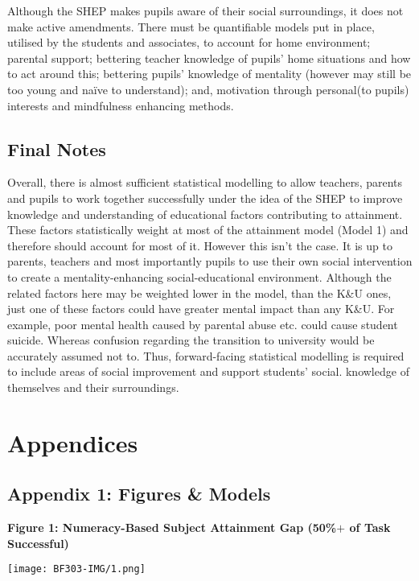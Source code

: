 \documentclass[11pt, english]{article}
\begin{document}
	Although the SHEP makes pupils aware of their social surroundings, it does not make active amendments. There must be quantifiable models put in place, utilised by the students and associates, to account for home environment; parental support; bettering teacher knowledge of pupils’ home situations and how to act around this; bettering pupils’ knowledge of mentality (however may still be too young and naïve to understand); and, motivation through personal(to pupils) interests and mindfulness enhancing methods.

	\subsection{Final Notes}

	Overall, there is almost sufficient statistical modelling to allow teachers, parents and pupils to work together successfully under the idea of the SHEP to improve knowledge and understanding of educational factors contributing to attainment. These factors statistically weight at most of the attainment model (Model 1) and therefore should account for most of it. However this isn’t the case. It is up to parents, teachers and most importantly pupils to use their own social intervention to create a mentality-enhancing social-educational environment. Although the related factors here may be weighted lower in the model, than the K\&U ones, just one of these factors could have greater mental impact than any K\&U. For example, poor mental health caused by parental abuse etc. could cause student suicide. Whereas confusion regarding the transition to university would be accurately assumed not to. Thus, forward-facing statistical modelling is required to include areas of social improvement and support students’ social. knowledge of themselves and their surroundings.

\newpage

\section{Appendices}

	\subsection{Appendix 1: Figures \& Models}

	\textbf{Figure 1: Numeracy-Based Subject Attainment Gap (50\%$+$ of Task Successful)}

	\begin{center}
		\texttt{[image: BF303-IMG/1.png]}
	\end{center}
\end{document}
